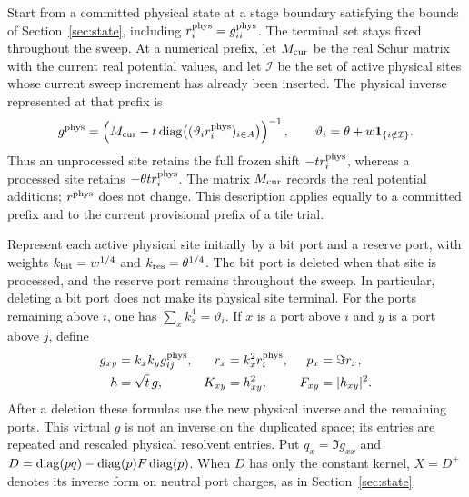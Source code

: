 Start from a committed physical state at a stage boundary satisfying the
bounds of Section~\ref{sec:state}, including $r_i^{\rm phys}=g_{ii}^{\rm phys}$.
The terminal set stays fixed throughout the sweep. At a numerical prefix,
let $M_{\rm cur}$ be the real Schur matrix with the current real potential
values, and let $\mathcal I$ be the set of active physical
sites whose current sweep increment has already been inserted. The physical
inverse represented at that prefix is
\begin{equation}\label{eq:sweep-physical-prefix}
 g^{\rm phys}
 =\left(M_{\rm cur}-t\operatorname{diag}\bigl((\vartheta_i r_i^{\rm phys})_{i\in A}\bigr)\right)^{-1},
 \qquad
 \vartheta_i=\theta+w\mathbf1_{\{i\notin\mathcal I\}}.
\end{equation}
Thus an unprocessed site retains the full frozen shift $-tr_i^{\rm phys}$,
whereas a processed site retains $-\theta t r_i^{\rm phys}$. The matrix
$M_{\rm cur}$ records the real potential additions; $r^{\rm phys}$ does not
change. This description applies equally to a committed prefix and to the
current provisional prefix of a tile trial.

Represent each active physical site initially by a bit port and a reserve
port, with weights $k_{\rm bit}=w^{1/4}$ and
$k_{\rm res}=\theta^{1/4}$. The bit port is deleted when that site is
processed, and the reserve port remains throughout the sweep. In particular,
deleting a bit port does not make its physical site terminal. For the ports
remaining above $i$, one has $\sum_x k_x^4=\vartheta_i$.
If $x$ is a port above $i$ and $y$ is a port above $j$, define
\begin{equation}\label{eq:sweep-virtual}
 \begin{aligned}
 g_{xy}&=k_xk_y g^{\rm phys}_{ij},&
 r_x&=k_x^2r^{\rm phys}_i,& p_x&=\Im r_x,\\
 h&=\sqrt t\,g,& K_{xy}&=h_{xy}^2,& F_{xy}&=|h_{xy}|^2.
 \end{aligned}
\end{equation}
After a deletion these formulas use the new physical inverse and the
remaining ports. This virtual $g$ is not an inverse on the duplicated
space; its entries are repeated and rescaled physical resolvent entries.
Put $q_x=\Im g_{xx}$ and
$D=\operatorname{diag}(pq)-\operatorname{diag}(p)F\operatorname{diag}(p)$. When $D$ has only the constant kernel,
$X=D^+$ denotes its inverse form on neutral port charges, as in
Section~\ref{sec:state}.

